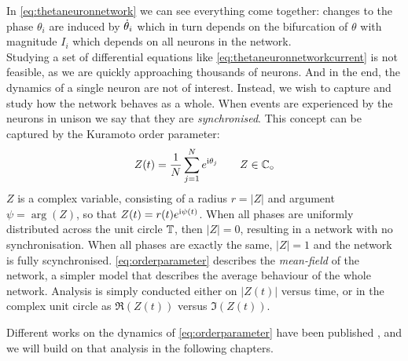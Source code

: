 In \eqref{eq:thetaneuronnetwork} we can see everything come together: changes to the phase $\theta_i$ are induced by ${\dot{\theta}}_i$ which in turn depends on the bifurcation of $\theta$ with magnitude $I_i$ which depends on all neurons in the network. \\


Studying a set of differential equations like \eqref{eq:thetaneuronnetworkcurrent} is not feasible, as we are quickly approaching thousands of neurons. And in the end, the dynamics of a single neuron are not of interest. Instead, we wish to capture and study how the network behaves as a whole. When events are experienced by the neurons in unison we say that they are \textsl{synchronised}. This concept can be captured by the Kuramoto order parameter:
\begin{align}
Z(t) = \frac{1}{N} \sum_{j=1}^N e^{{\rm{i}}\theta_j}  \qquad Z \in \mathbb{C}_\circ \label{eq:orderparameter}
\end{align}
$Z$ is a complex variable, consisting of a radius $r = \rvert Z \rvert$ and argument $\psi = \arg \left( Z \right)$, so that $Z(t) = r(t) e^{{\rm{i}} \psi(t)}$. When all phases are uniformly distributed across the unit circle ${\mathbb{T}}$, then $\rvert Z \rvert = 0$, resulting in a network with no synchronisation. When all phases are exactly the same, $\rvert Z \rvert = 1$ and the network is fully scynchronised. \eqref{eq:orderparameter} describes the \textsl{mean-field} of the network, a simpler model that describes the average behaviour of the whole network. Analysis is simply conducted either on $ \rvert Z(t) \rvert$ versus time, or in the complex unit circle as $\Re (Z(t))$ versus $\Im (Z(t))$.

Different works on the dynamics of \eqref{eq:orderparameter} have been published \cite{Luke2013, Martens2020}, and we will build on that analysis in the following chapters.


